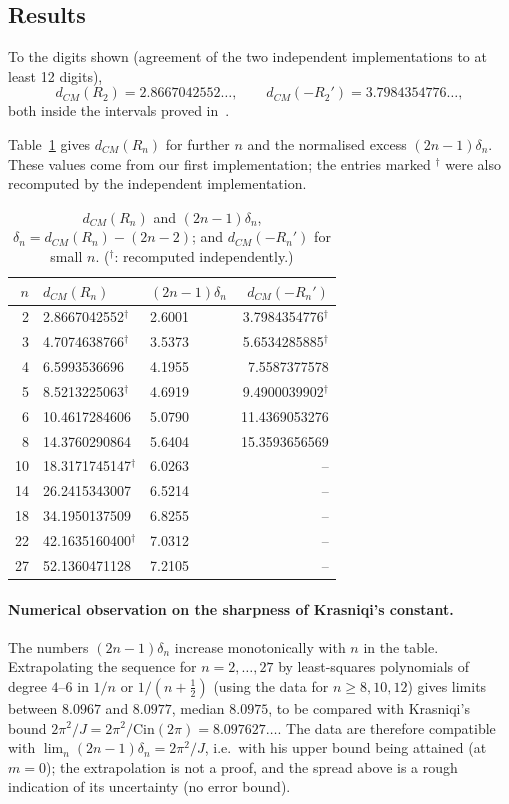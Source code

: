 \subsection{Results}
\begin{proposition}[numerical]\label{prop:stirling}
To the digits shown (agreement of the two independent implementations to at least 12 digits),
\[
d_{CM}(R_2)=2.8667042552\ldots,\qquad d_{CM}(-R_2')=3.7984354776\ldots,
\]
both inside the intervals proved in~\cite{Kr}.
\end{proposition}
Table~\ref{tab:stirling} gives $d_{CM}(R_n)$ for further $n$ and the normalised excess $(2n-1)\delta_n$. These values come from our first implementation; the entries marked $^\dagger$ were also recomputed by the independent implementation.

\begin{table}[h]
\centering
\caption{$d_{CM}(R_n)$ and $(2n-1)\delta_n$, $\delta_n=d_{CM}(R_n)-(2n-2)$; and $d_{CM}(-R_n')$ for small $n$. ($^\dagger$: recomputed independently.)}\label{tab:stirling}
\begin{tabular}{rllr}
\toprule
$n$ & $d_{CM}(R_n)$ & $(2n-1)\delta_n$ & $d_{CM}(-R_n')$\\
\midrule
2 & 2.8667042552$^\dagger$ & 2.6001 & 3.7984354776$^\dagger$\\
3 & 4.7074638766$^\dagger$ & 3.5373 & 5.6534285885$^\dagger$\\
4 & 6.5993536696 & 4.1955 & 7.5587377578\\
5 & 8.5213225063$^\dagger$ & 4.6919 & 9.4900039902$^\dagger$\\
6 & 10.4617284606 & 5.0790 & 11.4369053276\\
8 & 14.3760290864 & 5.6404 & 15.3593656569\\
10 & 18.3171745147$^\dagger$ & 6.0263 & --\\
14 & 26.2415343007 & 6.5214 & --\\
18 & 34.1950137509 & 6.8255 & --\\
22 & 42.1635160400$^\dagger$ & 7.0312 & --\\
27 & 52.1360471128 & 7.2105 & --\\
\bottomrule
\end{tabular}
\end{table}

\paragraph{Numerical observation on the sharpness of Krasniqi's constant.} The numbers $(2n-1)\delta_n$ increase monotonically with $n$ in the table. Extrapolating the sequence for $n=2,\dots,27$ by least-squares polynomials of degree $4$--$6$ in $1/n$ or $1/(n+\frac12)$ (using the data for $n\ge8,10,12$) gives limits between $8.0967$ and $8.0977$, median $8.0975$, to be compared with Krasniqi's bound $2\pi^2/J=2\pi^2/\mathrm{Cin}(2\pi)=8.097627\ldots$. The data are therefore compatible with $\lim_n(2n-1)\delta_n=2\pi^2/J$, i.e.\ with his upper bound being attained (at $m=0$); the extrapolation is not a proof, and the spread above is a rough indication of its uncertainty (no error bound).

